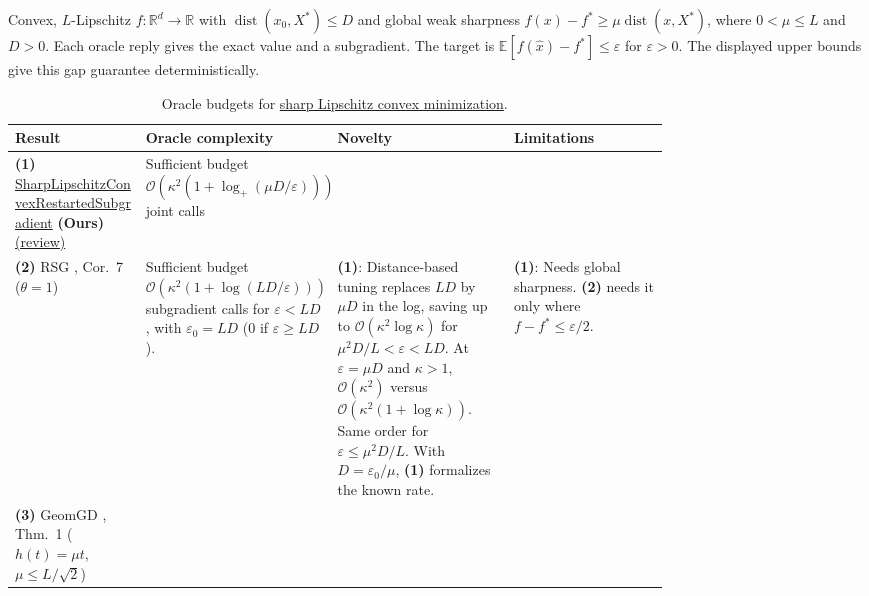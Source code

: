 \begin{table}[tp]
\centering
\caption{Oracle budgets for \protect\href{https://github.com/k3nfalt/longtails/blob/main/LongTails/Setups/SharpLipschitzConvex.lean}{sharp Lipschitz convex minimization}.}\label{tab:SharpLipschitzConvex}
\parbox{\linewidth}{\footnotesize Convex, $L$-Lipschitz $f\colon\mathbb R^d\to\mathbb R$ with $\operatorname{dist}(x_0,X^*)\le D$ and global weak sharpness $f(x)-f^*\ge\mu\operatorname{dist}(x,X^*)$, where $0<\mu\le L$ and $D>0$. Each oracle reply gives the exact value and a subgradient. The target is $\mathbb E[f(\hat x)-f^*]\le\varepsilon$ for $\varepsilon>0$. The displayed upper bounds give this gap guarantee deterministically.}\par\smallskip
\begin{threeparttable}
\footnotesize
\setlength{\tabcolsep}{4pt}\renewcommand{\arraystretch}{1.25}
\begin{tabularx}{\linewidth}{@{}>{\raggedright\arraybackslash}p{0.20\linewidth}>{\raggedright\arraybackslash}p{0.29\linewidth}>{\raggedright\arraybackslash}p{0.27\linewidth}>{\raggedright\arraybackslash}X@{}}
\toprule
\textbf{Result} & \textbf{Oracle complexity} & \textbf{Novelty} & \textbf{Limitations} \\
\midrule
\textbf{(1)} \href{https://github.com/k3nfalt/longtails/blob/main/LongTails/Theorems/SharpLipschitzConvexRestartedSubgradient.lean}{Sharp\allowbreak{}Lipschitz\allowbreak{}Convex\allowbreak{}Restarted\allowbreak{}Subgradient} \textbf{(Ours)} \href{https://github.com/k3nfalt/longtails/blob/main/scripts/reviews/SharpLipschitzConvexRestartedSubgradient.md}{(review)}
& Sufficient budget  $\mathcal{O}(\kappa^2(1+\log_+(\mu D/\varepsilon)))$ joint calls
& & \\
\midrule[1.2pt]
\textbf{(2)} RSG \citep{sharpYangLin2018v14}, Cor.~7 ($\theta=1$)
& Sufficient budget  $\mathcal{O}(\kappa^2(1+\log(LD/\varepsilon)))$ subgradient calls for $\varepsilon<LD$, with $\varepsilon_0=LD$ ($0$ if $\varepsilon\ge LD$).
& \textbf{(1)}: Distance-based tuning replaces $LD$ by $\mu D$ in the log, saving up to $\mathcal{O}(\kappa^2\log\kappa)$ for $\mu^2D/L<\varepsilon<LD$. At $\varepsilon=\mu D$ and $\kappa>1$, $\mathcal{O}(\kappa^2)$ versus $\mathcal{O}(\kappa^2(1+\log\kappa))$. Same order for $\varepsilon\le\mu^2D/L$. With $D=\varepsilon_0/\mu$, \textbf{(1)} formalizes the known rate.
& \textbf{(1)}: Needs global sharpness. \textbf{(2)} needs it only where $f-f^*\le\varepsilon/2$. \\
\midrule
\textbf{(3)} GeomGD \citep{sharpWang2025v1}, Thm.~1 ($h(t)=\mu t$, $\mu\le L/\sqrt{2}$)

\end{tabularx}
\end{threeparttable}
\end{table}
